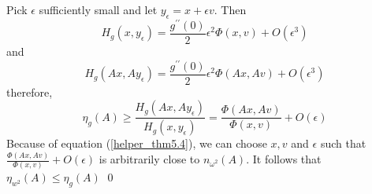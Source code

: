 Pick $\epsilon$ sufficiently small and let $y_\epsilon = x + \epsilon v$. Then \[H_g(x, y_\epsilon) = \frac{g^{\prime\prime}(0)}{2}\epsilon^2 \Phi(x,v) + O(\epsilon^3)\] and 
\[H_g(Ax, Ay_\epsilon) = \frac{g^{\prime\prime}(0)}{2}\epsilon^2 \Phi(Ax,Av) + O(\epsilon^3)\] therefore,
\[\eta_g(A) \geq \frac{H_g(Ax, Ay_\epsilon)}{H_g(x, y_\epsilon)}=\frac{\Phi(Ax, Av)}{\Phi(x,v)} + O(\epsilon)\]
Because of equation (\ref{helper_thm5.4}), we can choose $x, v$ and $\epsilon$ such that $\frac{\Phi(Ax, Av)}{\Phi(x,v)} + O(\epsilon)$ is arbitrarily close to $n_{\omega^2}(A)$. It follows that $\eta_{w^2}(A) \leq \eta_g(A)$ \qed

